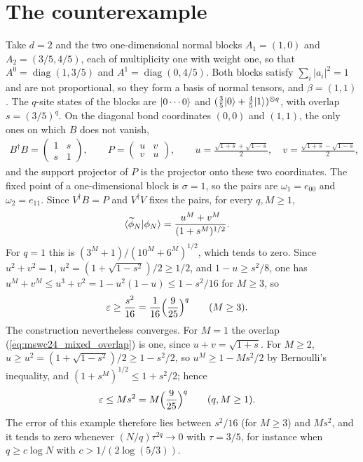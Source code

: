 \documentclass{article}
\begin{document}
\section{The counterexample}
Take $d=2$ and the two one-dimensional normal blocks $A_1=(1,0)$ and
$A_2=(3/5,4/5)$, each of multiplicity one with weight one, so that
$A^0=\operatorname{diag}(1,3/5)$ and $A^1=\operatorname{diag}(0,4/5)$. Both
blocks satisfy $\sum_i\lvert a_i\rvert^2=1$ and are not proportional, so they form a
basis of normal tensors, and $\beta=(1,1)$. The $q$-site states of the blocks are
$|0\cdots0\rangle$ and $(\tfrac35|0\rangle+\tfrac45|1\rangle)^{\otimes q}$, with overlap
$s=(3/5)^q$. On the diagonal bond coordinates $(0,0)$ and $(1,1)$, the only ones
on which $B$ does not vanish,
\begin{align}
    B^\dagger B=\begin{pmatrix}1&s\\s&1\end{pmatrix},\qquad
    P=\begin{pmatrix}u&v\\v&u\end{pmatrix},\qquad
    u=\frac{\sqrt{1+s}+\sqrt{1-s}}2,\quad
    v=\frac{\sqrt{1+s}-\sqrt{1-s}}2,
    \label{eq:mswc24_mixed_positive_part}
\end{align}
and the support projector of $P$ is the projector onto these two coordinates. The
fixed point of a one-dimensional block is $\sigma=1$, so the pairs are
$\omega_1=e_{00}$ and $\omega_2=e_{11}$. Since $V^\dagger B=P$ and
$V^\dagger V$ fixes the pairs, for every $q,M\geq1$,
\begin{align}
    \langle \widetilde\phi_N | \phi_N \rangle
     & =\frac{u^M+v^M}{(1+s^M)^{1/2}}.
    \label{eq:mswc24_mixed_overlap}
\end{align}
For $q=1$ this is $(3^M+1)/(10^M+6^M)^{1/2}$, which tends to zero. Since
$u^2+v^2=1$, $u^2=(1+\sqrt{1-s^2})/2\geq1/2$, and $1-u\geq s^2/8$, one has
$u^M+v^M\leq u^3+v^2=1-u^2(1-u)\leq1-s^2/16$ for $M\geq3$, so
\begin{align}
    \varepsilon & \geq\frac{s^2}{16}=\frac1{16}\Bigl(\frac9{25}\Bigr)^q
    \qquad(M\geq3).
    \label{eq:mswc24_mixed_lower_bound}
\end{align}
The construction nevertheless converges. For $M=1$ the overlap
(\ref{eq:mswc24_mixed_overlap}) is one, since $u+v=\sqrt{1+s}$. For $M\geq2$,
$u\geq u^2=(1+\sqrt{1-s^2})/2\geq1-s^2/2$, so $u^M\geq1-Ms^2/2$ by Bernoulli's
inequality, and $(1+s^M)^{1/2}\leq1+s^2/2$; hence
\begin{align}
    \varepsilon & \leq Ms^2=M\Bigl(\frac9{25}\Bigr)^q
    \qquad(q,M\geq1).
    \label{eq:mswc24_mixed_upper_bound}
\end{align}
The error of this example therefore lies between $s^2/16$ (for $M\geq3$) and $Ms^2$,
and it tends to zero whenever $(N/q)\tau^{2q}\to0$ with $\tau=3/5$, for instance when
$q\geq c\log N$ with $c>1/(2\log(5/3))$.
\end{document}
